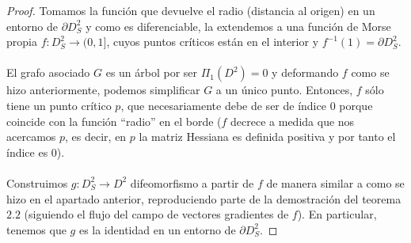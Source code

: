 \begin{proof}
	Tomamos la función que devuelve el radio (distancia al origen) en un entorno de $\partial D^2_S$ y como es diferenciable, la extendemos a una función de Morse propia $f:D^2_S \rightarrow (0,1]$, cuyos puntos críticos están en el interior y $f^{-1}(1) = \partial D^2_S$.\\
	\\ El grafo asociado $G$ es un árbol por ser $\Pi_1(D^2) = 0$ y deformando $f$ como se hizo anteriormente, podemos simplificar $G$  a un único punto. Entonces, $f$ sólo tiene un punto crítico $p$, que necesariamente debe de ser de índice $0$ porque coincide con la función ``radio'' en el borde ($f$ decrece a medida que nos acercamos $p$, es decir, en $p$ la matriz Hessiana es definida positiva y por tanto el índice es $0$).\\
	\\ Construimos $g:D^2_S \rightarrow D^2$ difeomorfismo a partir de $f$ de manera similar a como se hizo en el apartado anterior, reproduciendo parte de la demostración del teorema $2.2$ (siguiendo el flujo del campo de vectores gradientes de $f$). En particular, tenemos que $g$ es la identidad en un entorno de $\partial D^2_S$.
\end{proof}



\endinput
